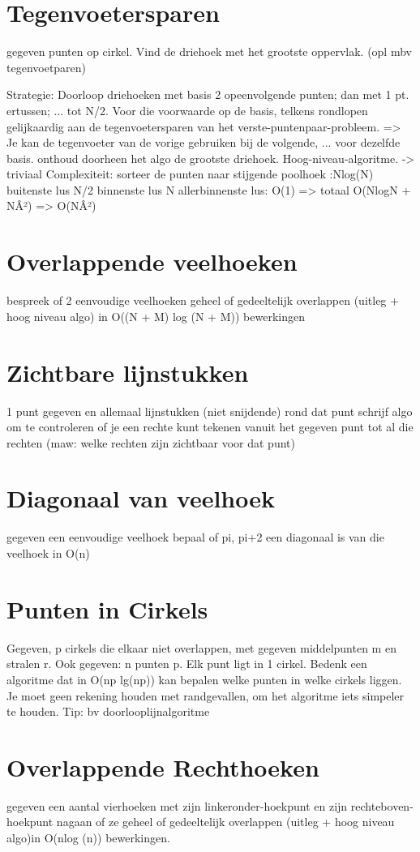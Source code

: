 \documentclass[12pt,a4paper]{article}
\begin{document}
\section{Tegenvoetersparen}
gegeven punten op cirkel. Vind de driehoek met het grootste oppervlak.
(opl mbv tegenvoetparen) 


Strategie:
        Doorloop driehoeken met basis 2 opeenvolgende punten; dan met 1 pt. ertussen; ... tot N/2.
        Voor die voorwaarde op de basis, telkens rondlopen gelijkaardig aan de tegenvoetersparen van het verste-puntenpaar-probleem. => Je kan de tegenvoeter van de vorige gebruiken bij de volgende, ... voor dezelfde basis.
        onthoud doorheen het algo de grootste driehoek. 
    Hoog-niveau-algoritme. -> triviaal
    Complexiteit:
        sorteer de punten naar stijgende poolhoek :Nlog(N)
        buitenste lus N/2
        binnenste lus N
        allerbinnenste lus: O(1)
        => totaal O(NlogN + NÂ²) => O(NÂ²) 




\section{Overlappende veelhoeken}
bespreek of 2 eenvoudige veelhoeken geheel of gedeeltelijk overlappen (uitleg + hoog niveau algo)
in O((N + M) log (N + M)) bewerkingen 

\section{Zichtbare lijnstukken}
1 punt gegeven en allemaal lijnstukken (niet snijdende) rond dat punt
schrijf algo om te controleren of je een rechte kunt tekenen vanuit het gegeven punt tot al die rechten
(maw: welke rechten zijn zichtbaar voor dat punt) 

\section{Diagonaal van veelhoek}
gegeven een eenvoudige veelhoek
bepaal of pi, pi+2 een diagonaal is van die veelhoek in O(n) 

\section{Punten in Cirkels}
Gegeven, p cirkels die elkaar niet overlappen, met gegeven middelpunten m en stralen r.
Ook gegeven: n punten p. Elk punt ligt in 1 cirkel.
Bedenk een algoritme dat in O(np lg(np)) kan bepalen welke punten in welke cirkels liggen.
Je moet geen rekening houden met randgevallen, om het algoritme iets simpeler te houden.
Tip: bv doorlooplijnalgoritme 

\section{Overlappende Rechthoeken}
gegeven een aantal vierhoeken met zijn linkeronder-hoekpunt en zijn rechteboven-hoekpunt nagaan of ze geheel of gedeeltelijk overlappen (uitleg + hoog niveau algo)in O(nlog (n)) bewerkingen. 


\fi
\end{document}
